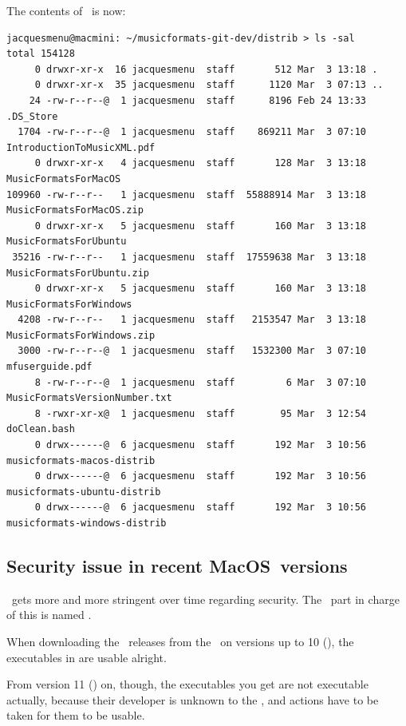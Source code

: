 The contents of \distrib\ is now:
\begin{lstlisting}[language=Terminal]
jacquesmenu@macmini: ~/musicformats-git-dev/distrib > ls -sal
total 154128
     0 drwxr-xr-x  16 jacquesmenu  staff       512 Mar  3 13:18 .
     0 drwxr-xr-x  35 jacquesmenu  staff      1120 Mar  3 07:13 ..
    24 -rw-r--r--@  1 jacquesmenu  staff      8196 Feb 24 13:33 .DS_Store
  1704 -rw-r--r--@  1 jacquesmenu  staff    869211 Mar  3 07:10 IntroductionToMusicXML.pdf
     0 drwxr-xr-x   4 jacquesmenu  staff       128 Mar  3 13:18 MusicFormatsForMacOS
109960 -rw-r--r--   1 jacquesmenu  staff  55888914 Mar  3 13:18 MusicFormatsForMacOS.zip
     0 drwxr-xr-x   5 jacquesmenu  staff       160 Mar  3 13:18 MusicFormatsForUbuntu
 35216 -rw-r--r--   1 jacquesmenu  staff  17559638 Mar  3 13:18 MusicFormatsForUbuntu.zip
     0 drwxr-xr-x   5 jacquesmenu  staff       160 Mar  3 13:18 MusicFormatsForWindows
  4208 -rw-r--r--   1 jacquesmenu  staff   2153547 Mar  3 13:18 MusicFormatsForWindows.zip
  3000 -rw-r--r--@  1 jacquesmenu  staff   1532300 Mar  3 07:10 mfuserguide.pdf
     8 -rw-r--r--@  1 jacquesmenu  staff         6 Mar  3 07:10 MusicFormatsVersionNumber.txt
     8 -rwxr-xr-x@  1 jacquesmenu  staff        95 Mar  3 12:54 doClean.bash
     0 drwx------@  6 jacquesmenu  staff       192 Mar  3 10:56 musicformats-macos-distrib
     0 drwx------@  6 jacquesmenu  staff       192 Mar  3 10:56 musicformats-ubuntu-distrib
     0 drwx------@  6 jacquesmenu  staff       192 Mar  3 10:56 musicformats-windows-distrib
\end{lstlisting}


\subsection{Security issue in recent MacOS\texttrademark\ versions}

\MacOS\ gets more and more stringent over time regarding security. The \OS\ part in charge of this is named \Gatekeeper.

When downloading the \mf\ releases from the \repo\ on versions up to 10 (), the executables in  are usable alright.

From version 11 () on, though, the executables you get are not executable actually, because their developer is unknown to the \OS, and actions have to be taken for them to be usable.

